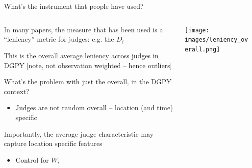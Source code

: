 \documentclass[notes,11pt, aspectratio=169]{beamer}
\newenvironment{wideitemize}{\itemize\addtolength{\itemsep}{10pt}}{\enditemize}
\begin{document}
\begin{frame}{What's the instrument that people have used?}
    \begin{columns}[onlytextwidth, T] %
      \begin{column}{.5\textwidth}
        \begin{wideitemize}
        \item In many papers, the measure that has been used is a
          ``leniency'' metric for judges: e.g. the $\hat{D}_{i}$
        \item This is the overall average leniency across judges in
          DGPY [note, not observation weighted -- hence outliers]
        \item What's the problem with just the overall, in the DGPY
          context?
          \begin{itemize}
          \item Judges are not random overall -- location (and time)
            specific
          \end{itemize}
        \item Importantly, the average judge characteristic may
          capture location specific features
          \begin{itemize}
          \item Control for $W_{i}$
          \end{itemize}
        \end{wideitemize}
      \end{column}%
      \hfill%
      \begin{column}{.5\textwidth}
        \texttt{[image: images/leniency\_overall.png]}
      \end{column}%
    \end{columns}
\end{frame}
\end{document}
